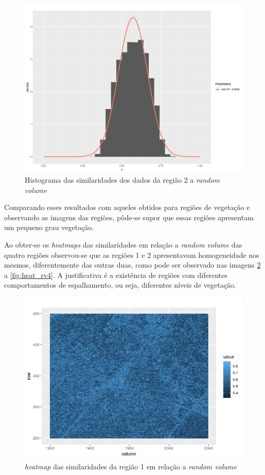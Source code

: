 \documentclass[12pt]{article}
\begin{document}
\begin{figure}[!h]

  \centering
  \includegraphics[width=0.8\linewidth]{../../Figures/Report_19_02_27/hist_rv_norm_region2.pdf}
  \caption{Histograma das similaridades dos dados da região 2 a \textit{random volume}}
  \label{fig:hist_norm_rv2}

\end{figure}

Comparando esses resultados com aqueles obtidos para regiões de vegetação e observando as imagens das regiões, pôde-se supor que essas regiões apresentam um pequeno grau vegetação.

Ao obter-se os \textit{heatmaps} das similaridades em relação a \textit{random volume} das quatro regiões observou-se que as regiões 1 e 2 apresentavam homogeneidade nos mesmos, diferentemente das outras duas, como pode ser observado nas imagens \ref{fig:heat_rv1} a \ref{fig:heat_rv4}. A justificativa é a existência de regiões com diferentes comportamentos de espalhamento, ou seja, diferentes níveis de vegetação.

\begin{figure}[!h]

  \centering
  \includegraphics[width=0.8\linewidth]{../../Images/Report_19_02_27/heatmap_rv_region1.png}
  \caption{\textit{heatmap} das similaridades da região 1 em relação a \textit{random volume}}
  \label{fig:heat_rv1}

\end{figure}
\end{document}
